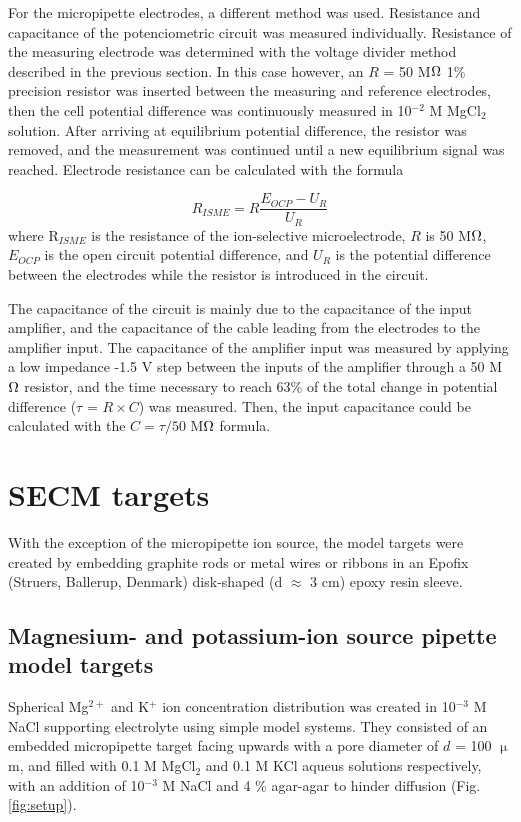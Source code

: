 For the micropipette electrodes, a different method was used.
Resistance and capacitance of the potenciometric circuit was measured individually.
Resistance of the measuring electrode was determined with the voltage divider method described in the previous section.
In this case however, an $R$ = 50 M$\ohm$ 1\% precision resistor was inserted between the measuring and reference electrodes, then the cell potential difference was continuously measured in 10$^{-2}$ M MgCl$_2$ solution.
After arriving at equilibrium potential difference, the resistor was removed, and the measurement was continued until a new equilibrium signal was reached.
Electrode resistance can be calculated with the formula

\begin{equation}
\label{eq:divider}
        R_{ISME}
        =
        R
        \frac
                {E_{OCP} - U_{R}}
                {U_{R}}
\end{equation}
where R$_{ISME}$ is the resistance of the ion-selective microelectrode, $R$ is 50 M$\ohm$, $E_{OCP}$ is the open circuit potential difference, and $U_{R}$ is the potential difference between the electrodes while the resistor is introduced in the circuit.

The capacitance of the circuit is mainly due to the capacitance of the input amplifier, and the capacitance of the cable leading from the electrodes to the amplifier input.
The capacitance of the amplifier input was measured by applying a low impedance -1.5 V step between the inputs of the amplifier through a 50 M$\ohm$ resistor, and the time necessary to reach 63\% of the total change in potential difference ($\tau$ = $R\times C$) was measured.
Then, the input capacitance could be calculated with the $C = \tau/50$ M$\ohm$ formula.
		
	\section{SECM targets}
With the exception of the micropipette ion source, the model targets were created by embedding graphite rods or metal wires or ribbons in an Epofix (Struers, Ballerup, Denmark) disk-shaped (d $\approx$ 3 cm) epoxy resin sleeve. 
	\subsection{Magnesium- and potassium-ion source pipette model targets}
Spherical Mg$^{2+}$ and K$^+$ ion concentration distribution was created in 10$^{-3}$ M NaCl supporting electrolyte using simple model systems.
They consisted of an embedded micropipette target facing upwards with a pore diameter of $d$ = 100 $\upmu$m, and filled with 0.1 M MgCl$_2$ and 0.1 M KCl aqueus solutions respectively, with an addition of 10$^{-3}$ M NaCl and 4 \% agar-agar to hinder diffusion (Fig. \ref{fig:setup}).

